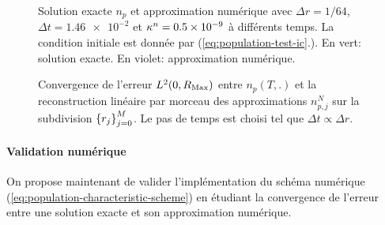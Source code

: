 \begin{figure}[h]
  \begin{center}
    
    
    
    
    
    
  \end{center}
  \begin{center}
    \caption{Solution exacte $n_p$ et approximation numérique avec
      $\Delta r = 1/64$, $\Delta t = \num{1.46e-2}$ et
      $\kappa^n = \num{0.5e-9}$ à différents temps. La
      condition initiale est donnée par
      (\ref{eq:population-test-ic}.). En vert: solution exacte. En
      violet: approximation numérique.}
    \label{fig:population-timelapse}
  \end{center}
\end{figure}

\begin{figure}[h!]
  \begin{center}
    
    \caption{Convergence de l'erreur $L^2(0, R_\mathrm{Max})$ entre $n_p(T, .)$
      et la reconstruction linéaire par morceau des approximations
      $n_{p,j}^N$ sur la subdivision $\left\{ r_j \right\}_{j = 0}^M$. Le pas
      de temps est choisi tel que $\Delta t \propto \Delta r$.}
    \label{fig:population-convergence}
  \end{center}
\end{figure}
\paragraph{Validation numérique} On propose maintenant de valider
l'implémentation du schéma numérique
(\ref{eq:population-characteristic-scheme}) en étudiant la
convergence de l'erreur entre une solution exacte et son approximation
numérique.

